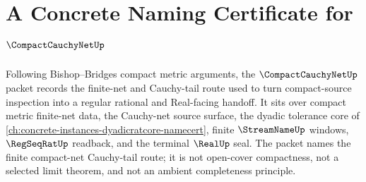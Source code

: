 \chapter{A Concrete Naming Certificate for $\CompactCauchyNetUp$}
\label{ch:concrete-instances-compact-cauchy-net-namecert}

Following Bishop--Bridges compact metric arguments, the $\CompactCauchyNetUp$ packet records the finite-net and Cauchy-tail route used to turn compact-source inspection into a regular rational and Real-facing handoff. It sits over compact metric finite-net data, the Cauchy-net source surface, the dyadic tolerance core of \autoref{ch:concrete-instances-dyadicratcore-namecert}, finite $\StreamNameUp$ windows, $\RegSeqRatUp$ readback, and the terminal $\RealUp$ seal. The packet names the finite compact-net Cauchy-tail route; it is not open-cover compactness, not a selected limit theorem, and not an ambient completeness principle.

